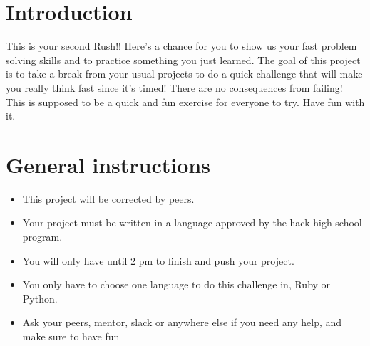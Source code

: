 \documentclass{42-en}
\begin{document}
\chapter{Introduction}

    This is your second Rush!! Here's a chance for you to show us your fast problem solving skills and to practice something you just learned.
    The goal of this project is to take a break from your usual projects to do a quick challenge that will make you really think fast since it's timed! There are no consequences from failing! This is supposed to be a quick and fun exercise for everyone to try. Have fun with it. 

\chapter{General instructions}

    \begin{itemize}\itemsep1pt
        \item This project will be corrected by peers.
        \item Your project must be written in a language approved by
        the hack high school program.
        \item You will only have until 2 pm to finish and push your project.
        \item You only have to choose one language to do this challenge in,
         Ruby or Python.
        \item Ask your peers, mentor, slack or anywhere else if you need
        any help, and make sure to have fun\\
    \end{itemize}

\end{document}

